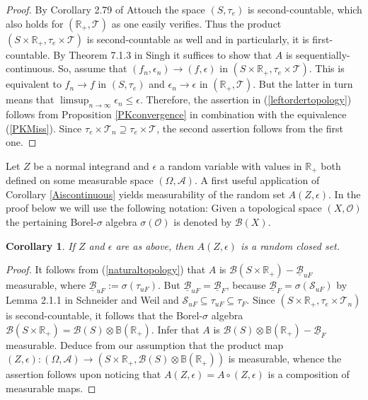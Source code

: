 \documentclass[sn-mathphys,Numbered]{sn-jnl}%
\theoremstyle{thmstyleone}%
\theoremstyle{thmstyletwo}%
\newtheorem{corollary}{Corollary}%
\theoremstyle{thmstylethree}%
\begin{document}
\begin{proof} By Corollary 2.79 of Attouch \cite{Attouch} the space $(S,\tau_e)$ is second-countable, which also holds for $(\mathbb{R}_+,\mathcal{T})$ as one easily verifies. Thus the product
$(S \times \mathbb{R}_+,\tau_e \times \mathcal{T})$ is second-countable as well and in particularly, it is first-countable. By Theorem 7.1.3 in Singh \cite{Singh} it suffices to show that
$A$ is sequentially-continuous. So, assume that $(f_n,\epsilon_n) \rightarrow (f,\epsilon)$ in $(S \times \mathbb{R}_+,\tau_e \times \mathcal{T})$. This is equivalent to
$f_n \rightarrow f$ in $(S,\tau_e)$ and $\epsilon_n \rightarrow \epsilon$ in $(\mathbb{R}_+,\mathcal{T})$. But the latter in turn means that $\limsup_{n \rightarrow \infty} \epsilon_n \le \epsilon$.
Therefore, the assertion in (\ref{leftordertopology}) follows from Proposition \ref{PKconvergence} in combination with the equivalence (\ref{PKMiss}). Since $\tau_e \times \mathcal{T}_n \supseteq \tau_e \times \mathcal{T}$,
the second assertion follows from the first one.
\end{proof}

Let $Z$ be a normal integrand and $\epsilon$ a random variable with values in $\mathbb{R}_+$ both defined on some measurable space $(\Omega,\mathcal{A})$. A first useful application of Corollary \ref{Aiscontinuous} yields
measurability of the random set $A(Z,\epsilon)$. In the proof below we will use the following notation: Given a topological space $(X,\mathcal{O})$ the pertaining Borel-$\sigma$ algebra $\sigma(\mathcal{O})$ is denoted by $\mathcal{B}(X)$.\\

\begin{corollary} \label{Aisrandomclosedset} If $Z$ and $\epsilon$ are as above, then $A(Z,\epsilon)$ is a random closed set.
\end{corollary}

\begin{proof} It follows from (\ref{naturaltopology}) that $A$ is $\mathcal{B}(S \times \mathbb{R}_+)-\underline{\mathcal{B}}_{uF}$ measurable, where $\underline{\mathcal{B}}_{uF} := \sigma(\tau_{uF})$. But $\underline{\mathcal{B}}_{uF}=\underline{\mathcal{B}}_{F}$,
because $\underline{\mathcal{B}}_{F} = \sigma(\mathcal{S}_{uF})$ by Lemma 2.1.1 in Schneider and Weil \cite{Weil} and $\mathcal{S}_{uF} \subseteq \tau_{uF} \subseteq \tau_F.$
Since $(S \times \mathbb{R}_+,\tau_e \times \mathcal{T}_n)$ is second-countable, it follows that the Borel-$\sigma$ algebra $\mathcal{B}(S \times \mathbb{R}_+) = \mathcal{B}(S) \otimes \mathbb{B}(\mathbb{R}_+)$.
Infer that $A$ is $\mathcal{B}(S) \otimes \mathbb{B}(\mathbb{R}_+)-\underline{\mathcal{B}}_{F}$ measurable. Deduce from our assumption that the product map $(Z,\epsilon):(\Omega,\mathcal{A}) \rightarrow (S \times \mathbb{R}_+,\mathcal{B}(S) \otimes \mathbb{B}(\mathbb{R}_+))$ is measurable, whence the assertion follows upon noticing that $A(Z,\epsilon)=A \circ (Z,\epsilon)$ is a composition of measurable maps.
\end{proof}
\end{document}
